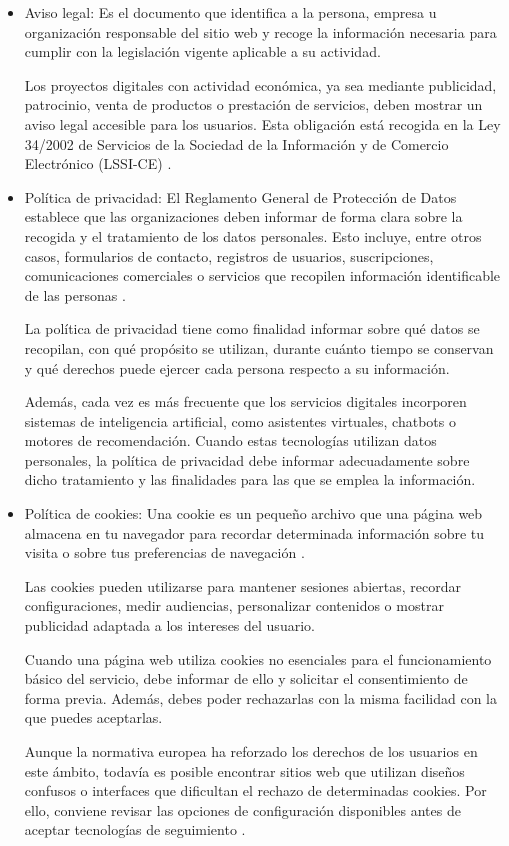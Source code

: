 \documentclass[
  spanish,
  a4paper,
  openany]{book}
\begin{document}
\begin{itemize}
\item
  Aviso legal: Es el documento que identifica a la persona, empresa u organización responsable del sitio web y recoge la información necesaria para cumplir con la legislación vigente aplicable a su actividad.

  Los proyectos digitales con actividad económica, ya sea mediante publicidad, patrocinio, venta de productos o prestación de servicios, deben mostrar un aviso legal accesible para los usuarios. Esta obligación está recogida en la Ley 34/2002 de Servicios de la Sociedad de la Información y de Comercio Electrónico (LSSI-CE) \citep{IONOS-legal}.
\item
  Política de privacidad: El Reglamento General de Protección de Datos establece que las organizaciones deben informar de forma clara sobre la recogida y el tratamiento de los datos personales. Esto incluye, entre otros casos, formularios de contacto, registros de usuarios, suscripciones, comunicaciones comerciales o servicios que recopilen información identificable de las personas \citep{IONOS-privacidad}.

  La política de privacidad tiene como finalidad informar sobre qué datos se recopilan, con qué propósito se utilizan, durante cuánto tiempo se conservan y qué derechos puede ejercer cada persona respecto a su información.

  Además, cada vez es más frecuente que los servicios digitales incorporen sistemas de inteligencia artificial, como asistentes virtuales, chatbots o motores de recomendación. Cuando estas tecnologías utilizan datos personales, la política de privacidad debe informar adecuadamente sobre dicho tratamiento y las finalidades para las que se emplea la información.
\item
  Política de cookies: Una cookie es un pequeño archivo que una página web almacena en tu navegador para recordar determinada información sobre tu visita o sobre tus preferencias de navegación \citep{IONOS-cookies}.

  Las cookies pueden utilizarse para mantener sesiones abiertas, recordar configuraciones, medir audiencias, personalizar contenidos o mostrar publicidad adaptada a los intereses del usuario.

  Cuando una página web utiliza cookies no esenciales para el funcionamiento básico del servicio, debe informar de ello y solicitar el consentimiento de forma previa. Además, debes poder rechazarlas con la misma facilidad con la que puedes aceptarlas.

  Aunque la normativa europea ha reforzado los derechos de los usuarios en este ámbito, todavía es posible encontrar sitios web que utilizan diseños confusos o interfaces que dificultan el rechazo de determinadas cookies. Por ello, conviene revisar las opciones de configuración disponibles antes de aceptar tecnologías de seguimiento \citep{AEPD-cookies}.
\end{itemize}
\end{document}
